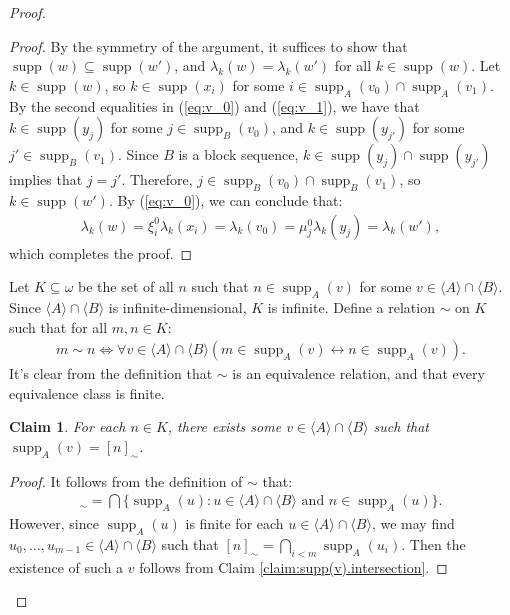 \documentclass[10pt,a4paper]{amsart}
\theoremstyle{plain}
\numberwithin{equation}{section}
\newtheorem{claim}{Claim}
\theoremstyle{definition}
\newcommand{\func}{\operatorname}
\renewcommand{\c}[1]{\langle #1 \rangle}
\newcommand{\supp}{\func{supp}}
\newenvironment{midproof}[1][Proof]
  {\begin{proof}[#1]\renewcommand{\qedsymbol}{$\blacksquare$}}
  {\end{proof}}
\begin{document}
\begin{proof}
\begin{midproof}
        By the symmetry of the argument, it suffices to show that $\supp(w) \subseteq \supp(w')$, and $\lambda_k(w) = \lambda_k(w')$ for all $k \in \supp(w)$. Let $k \in \supp(w)$, so $k \in \supp(x_i)$ for some $i \in \supp_A(v_0) \cap \supp_A(v_1)$. By the second equalities in (\ref{eq:v_0}) and (\ref{eq:v_1}), we have that $k \in \supp(y_j)$ for some $j \in \supp_B(v_0)$, and $k \in \supp(y_{j'})$ for some $j' \in \supp_B(v_1)$. Since $B$ is a block sequence, $k \in \supp(y_j) \cap \supp(y_{j'})$ implies that $j = j'$. Therefore, $j \in \supp_B(v_0) \cap \supp_B(v_1)$, so $k \in \supp(w')$. By (\ref{eq:v_0}), we can conclude that:
        \begin{align*}
            \lambda_k(w) = \xi_i^0\lambda_k(x_i) = \lambda_k(v_0) = \mu_j^0\lambda_k(y_j) = \lambda_k(w'),
        \end{align*}
        which completes the proof. 
    \end{midproof}
    
    Let $K \subseteq \omega$ be the set of all $n$ such that $n \in \supp_A(v)$ for some $v \in \c{A} \cap \c{B}$. Since $\c{A} \cap \c{B}$ is infinite-dimensional, $K$ is infinite. Define a relation $\sim$ on $K$ such that for all $m,n \in K$:
    \begin{align*}
        m \sim n \iff \forall v \in \c{A} \cap \c{B}(m \in \supp_A(v) \leftrightarrow n \in \supp_A(v)).
    \end{align*}
    It's clear from the definition that $\sim$ is an equivalence relation, and that every equivalence class is finite. 

    \begin{claim}
        For each $n \in K$, there exists some $v \in \c{A} \cap \c{B}$ such that $\supp_A(v) = [n]_\sim$. 
    \end{claim}

    \begin{midproof}
        It follows from the definition of $\sim$ that:
        \begin{align*}
            [n]_\sim = \bigcap\{\supp_A(u) : u \in \c{A} \cap \c{B} \text{ and } n \in \supp_A(u)\}.
        \end{align*}
        However, since $\supp_A(u)$ is finite for each $u \in \c{A} \cap \c{B}$, we may find $u_0,\dots,u_{m-1} \in \c{A} \cap \c{B}$ such that $[n]_\sim = \bigcap_{i<m} \supp_A(u_i)$. Then the existence of such a $v$ follows from Claim \ref{claim:supp(v).intersection}.
    \end{midproof}


\end{proof}
\end{document}

